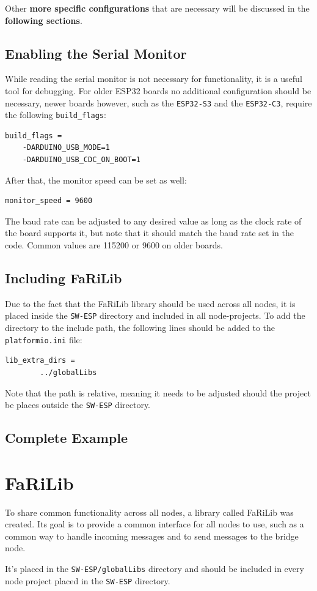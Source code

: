         Other \textbf{more specific 
        configurations} that are necessary will be discussed in the \textbf{following 
        sections}.

    \subsection{Enabling the Serial Monitor}
    While reading the serial monitor is not necessary for functionality, it is a
    useful tool for debugging. For older ESP32 boards no additional configuration 
    should be necessary, newer boards however, such as the \texttt{ESP32-S3} and the 
    \texttt{ESP32-C3}, require the following \texttt{build\_flags}: 
    \begin{lstlisting}[style=cppCode]
    build_flags =
    -DARDUINO_USB_MODE=1
    -DARDUINO_USB_CDC_ON_BOOT=1
    \end{lstlisting}
    After that, the monitor speed can be set as well:
    \begin{lstlisting}[style=cppCode]
    monitor_speed = 9600
    \end{lstlisting}
    The baud rate can be adjusted to any desired value as long as the clock rate
    of the board supports it, but note that it should match the baud rate set in 
    the code. Common values are 115200 or 9600 on older boards.

    \subsection{Including FaRiLib} \label{sec:farilib_include}
    Due to the fact that the FaRiLib library should be used across all nodes, it is
    placed inside the \texttt{SW-ESP} directory and included in all node-projects.
    To add the directory to the include path, the following lines should be added to
    the \texttt{platformio.ini} file:
    \begin{lstlisting}[style=cppCode]
    lib_extra_dirs =
        ../globalLibs
    \end{lstlisting}
    Note that the path is relative, meaning it needs to be adjusted should the project
    be places outside the \texttt{SW-ESP} directory.

    \subsection{Complete Example}

\section{FaRiLib}
    To share common functionality across all nodes, a library called FaRiLib was
    created. Its goal is to provide a common interface for all nodes to use, such as
    a common way to handle incoming messages and to send messages to the bridge node. 
    \par\vspace{0.5em}
    It's placed in the \texttt{SW-ESP/globalLibs} directory and should be included in
    every node project placed in the \texttt{SW-ESP} directory.
